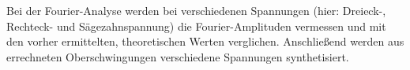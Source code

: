Bei der Fourier-Analyse werden bei verschiedenen Spannungen (hier: Dreieck-, Rechteck- und Sägezahnspannung) die Fourier-Amplituden vermessen und mit den vorher ermittelten, theoretischen Werten verglichen. Anschließend werden aus errechneten Oberschwingungen verschiedene Spannungen synthetisiert.
